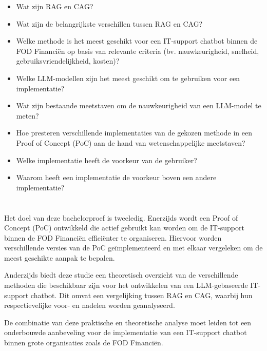 \begin{itemize}
    \item Wat zijn RAG en CAG?
    \item Wat zijn de belangrijkste verschillen tussen RAG en CAG?
    \item Welke methode is het meest geschikt voor een IT-support chatbot binnen de FOD Financiën op basis van relevante criteria (bv. nauwkeurigheid, snelheid, gebruiksvriendelijkheid, kosten)?
    \item Welke LLM-modellen zijn het meest geschikt om te gebruiken voor een implementatie?
    \item Wat zijn bestaande meetstaven om de nauwkeurigheid van een LLM-model te meten?
    \item Hoe presteren verschillende implementaties van de gekozen methode in een Proof of Concept (PoC) aan de hand van wetenschappelijke meetstaven?
    \item Welke implementatie heeft de voorkeur van de gebruiker?
    \item Waarom heeft een implementatie de voorkeur boven een andere implementatie?
\end{itemize}

\section{}%
\label{sec:onderzoeksdoelstelling}

Het doel van deze bachelorproef is tweeledig. Enerzijds wordt een Proof of Concept (PoC) ontwikkeld die actief gebruikt kan worden om de IT-support binnen de FOD Financiën efficiënter te organiseren. Hiervoor worden verschillende versies van de PoC geïmplementeerd en met elkaar vergeleken om de meest geschikte aanpak te bepalen.

Anderzijds biedt deze studie een theoretisch overzicht van de verschillende methoden die beschikbaar zijn voor het ontwikkelen van een LLM-gebaseerde IT-support chatbot. Dit omvat een vergelijking tussen RAG en CAG, waarbij hun respectievelijke voor- en nadelen worden geanalyseerd.

De combinatie van deze praktische en theoretische analyse moet leiden tot een onderbouwde aanbeveling voor de implementatie van een IT-support chatbot binnen grote organisaties zoals de FOD Financiën.

\section{}%
\label{sec:opzet-bachelorproef}

